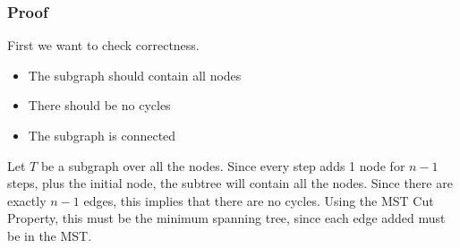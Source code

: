 \documentclass[10pt]{article}
\begin{document}
\subsubsection*{Proof}
First we want to check correctness.
\begin{itemize}
	\item The subgraph should contain all nodes
	\item There should be no cycles
	\item The subgraph is connected
\end{itemize}
Let $T$ be a subgraph over all the nodes.  Since every step adds 1 node for $n - 1$ steps, plus the initial node, the subtree will contain all the nodes.  Since there are exactly $n - 1$ edges, this implies that there are no cycles.  Using the MST Cut Property, this must be the minimum spanning tree, since each edge added must be in the MST.
\end{document}
